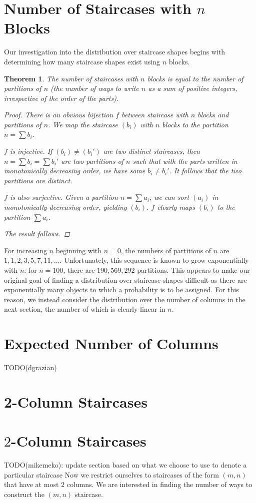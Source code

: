 \documentclass[12pt]{amsart}
\newtheorem{theorem}{Theorem}[section]
\newcommand{\newsection}[2]{
\section{#1 \label{#2}}
}
\begin{document}
\newsection{Number of Staircases with $n$ Blocks}{sec:numstaircases}
Our investigation into the distribution over staircase shapes begins with determining how many staircase shapes exist using $n$ blocks.

\begin{theorem}
The number of staircases with $n$ blocks is equal to the number of partitions of $n$ (the number of ways to write $n$ as a sum of positive integers, irrespective of the order of the parts).
\begin{proof}
There is an obvious bijection $f$ between staircase with $n$ blocks and partitions of $n$. We map the staircase $(b_i)$ with $n$ blocks to the partition $n=\sum b_i$.

$f$ is injective. If $(b_i)\neq (b_i')$ are two distinct staircases, then $n = \sum b_i = \sum b_i'$ are two partitions of $n$ such that with the parts written in monotonically decreasing order, we have some $b_i\neq b_i'$. It follows that the two partitions are distinct.

$f$ is also surjective. Given a partition $n = \sum a_i$, we can sort $(a_i)$ in monotonically decreasing order, yielding $(b_i)$. $f$ clearly maps $(b_i)$ to the partition $\sum a_i$.

The result follows.
\end{proof}
\end{theorem}

For increasing $n$ beginning with $n = 0$, the numbers of partitions of $n$ are $1, 1, 2, 3, 5, 7, 11, \ldots$. Unfortunately, this sequence is known to grow exponentially with $n$: for $n = 100$, there are $190,569,292$ partitions. This appears to make our original goal of finding a distribution over staircase shapes difficult as there are exponentially many objects to which a probability is to be assigned. For this reason, we instead consider the distribution over the number of columns in the next section, the number of which is clearly linear in $n$.

\newsection{Expected Number of Columns}{sec:expectedcolumns}
TODO(dgrazian)

\newsection{2-Column Staircases}{sec:twocolumn}
\section{$2$-Column Staircases\label{sec:2column}}
TODO(mikemeko): update section based on what we choose to use to denote a particular staircase
Now we restrict ourselves to staircases of the form $(m,n)$ that have at most $2$ columns. We are interested in finding the number of ways to construct the $(m,n)$ staircase.
\end{document}
